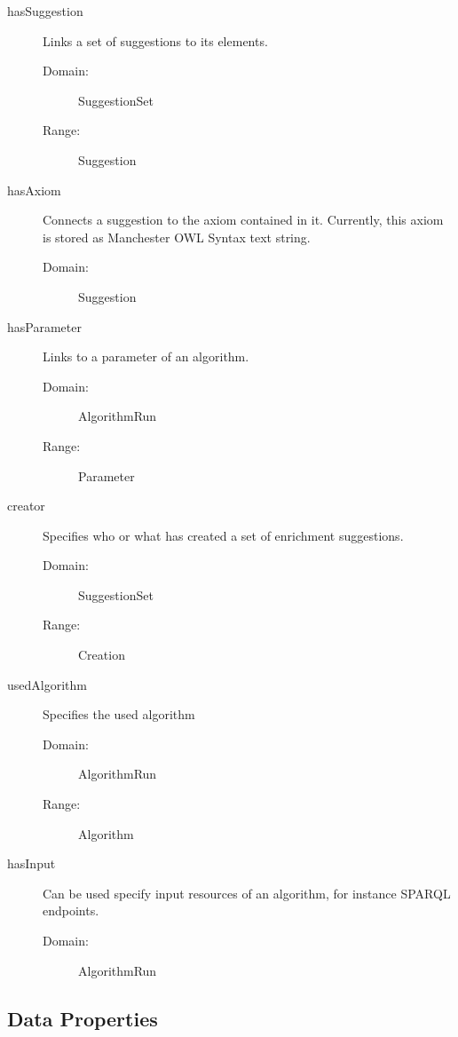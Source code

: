 \documentclass[a4paper,12pt]{scrartcl}
\begin{document}
\begin{description}
  \item[hasSuggestion] Links a set of suggestions to its elements.
    \begin{description}
      \item[Domain:] SuggestionSet
      \item[Range:] Suggestion
    \end{description}
  \item[hasAxiom] Connects a suggestion to the axiom contained in it. Currently, this axiom is stored as Manchester OWL Syntax text string. 
  \begin{description}
      \item[Domain:] Suggestion
  \end{description}
  \item[hasParameter] Links to a parameter of an algorithm.
    \begin{description}
      \item[Domain:] AlgorithmRun
      \item[Range:] Parameter
    \end{description}
  \item[creator] Specifies who or what has created a set of enrichment suggestions.
    \begin{description}
      \item[Domain:] SuggestionSet
      \item[Range:] Creation
    \end{description}
  \item[usedAlgorithm] Specifies the used algorithm
    \begin{description}
      \item[Domain:] AlgorithmRun
      \item[Range:] Algorithm
    \end{description}
  \item[hasInput] Can be used specify input resources of an algorithm, for instance SPARQL endpoints.
    \begin{description}
      \item[Domain:] AlgorithmRun
    \end{description}
\end{description}

\subsection*{Data Properties}
\end{document}
